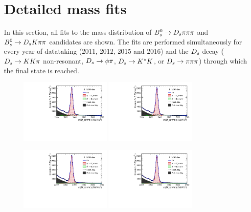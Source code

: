 \section{Detailed mass fits}
\label{sec:DetailedMassfits}

In this section, all fits to the mass distribution of ${{B}^0_{s}}\rightarrow{\ensuremath{{D}_{s}}}{\ensuremath{\pi}}{\ensuremath{\pi}}{\ensuremath{\pi}}$ and ${{B}^0_{s}}\rightarrow{\ensuremath{{D}_{s}}}{\ensuremath{K}}{\ensuremath{\pi}}{\ensuremath{\pi}}$ candidates are shown. 
The fits are performed simultaneously for every year of datataking (2011, 2012, 2015 and 2016) 
and the ${{D}_{s}}$ decay (${{D}_{s}}\rightarrow{\ensuremath{K}}{\ensuremath{K}}{\ensuremath{\pi}}$ non-resonant, ${{D}_{s}}\rightarrow\phi\pi$, ${{D}_{s}}\rightarrow{\ensuremath{{K}^*}}{\ensuremath{K}}$, or ${{D}_{s}}\rightarrow{\ensuremath{\pi}}{\ensuremath{\pi}}{\ensuremath{\pi}}$) through which the final state is reached.    

\begin{figure}[h]
\centering
\includegraphics[height=!,width=0.4\textwidth]{figs/MassFit/norm_y11_phipi.pdf}
\includegraphics[height=!,width=0.4\textwidth]{figs/MassFit/norm_y11_KsK.pdf}

\includegraphics[height=!,width=0.4\textwidth]{figs/MassFit/norm_y11_KKpi_NR.pdf}
\includegraphics[height=!,width=0.4\textwidth]{figs/MassFit/norm_y11_pipipi.pdf}


\end{figure}
